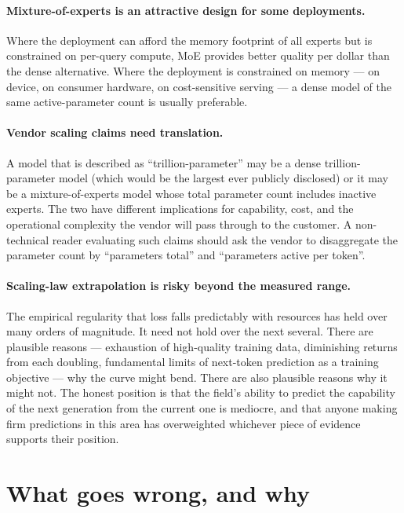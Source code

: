 \paragraph{Mixture-of-experts is an attractive design for some
deployments.} Where the deployment can afford the memory
footprint of all experts but is constrained on per-query
compute, MoE provides better quality per dollar than the dense
alternative. Where the deployment is constrained on memory --- on
device, on consumer hardware, on cost-sensitive serving --- a
dense model of the same active-parameter count is usually
preferable.

\paragraph{Vendor scaling claims need translation.} A model
that is described as ``trillion-parameter'' may be a dense
trillion-parameter model (which would be the largest ever
publicly disclosed) or it may be a mixture-of-experts model
whose total parameter count includes inactive experts. The two
have different implications for capability, cost, and the
operational complexity the vendor will pass through to the
customer. A non-technical reader evaluating such claims should
ask the vendor to disaggregate the parameter count by
``parameters total'' and ``parameters active per token''.

\paragraph{Scaling-law extrapolation is risky beyond the
measured range.} The empirical regularity that loss falls
predictably with resources has held over many orders of
magnitude. It need not hold over the next several. There are
plausible reasons --- exhaustion of high-quality training
data, diminishing returns from each doubling, fundamental
limits of next-token prediction as a training objective ---
why the curve might bend. There are also plausible reasons
why it might not. The honest position is that the field's
ability to predict the capability of the next generation from
the current one is mediocre, and that anyone making firm
predictions in this area has overweighted whichever piece of
evidence supports their position.

\section{What goes wrong, and why}

